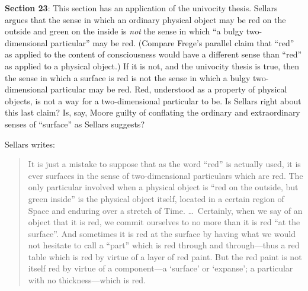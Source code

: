 \documentclass[11pt]{article}
\begin{document}
\textbf{Section 23}: This section has an application of the univocity thesis. Sellars argues that the sense in which an ordinary physical object may be red on the outside and green on the inside is \emph{not} the sense in which ``a bulgy two-dimensional particular'' may be red. (Compare Frege's parallel claim that ``red'' as applied to the content of consciousness would have a different sense than ``red'' as applied to a physical object.) If it is not, and the univocity thesis is true, then the sense in which a surface is red is not the sense in which a bulgy two-dimensional particular may be red. Red, understood as a property of physical objects, is not a way for a two-dimensional particular to be. Is Sellars right about this last claim? Is, say, Moore guilty of conflating the ordinary and extraordinary senses of ``surface'' as Sellars suggests? 

Sellars writes:
\begin{quote}
    It is just a mistake to suppose that as the word ``red'' is actually used, it is ever surfaces in the sense of two-dimensional particulars which are red. The only particular involved when a physical object is ``red on the outside, but green inside'' is the physical object itself, located in a certain region of Space and enduring over a stretch of Time. \ldots\ Certainly, when we say of an object that it is red, we commit ourselves to no more than it is red ``at the surface''. And sometimes it is red at the surface by having what we would not hesitate to call a ``part'' which is red through and through---thus a red table which is red by virtue of a layer of red paint. But the red paint is not itself red by virtue of a component---a `surface' or `expanse'; a particular with no thickness---which is red.
\end{quote}
\end{document}
